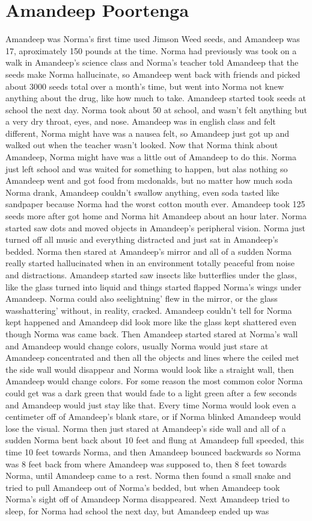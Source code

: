 \documentclass[12pt]{book}
\begin{document}
\chapter{Amandeep Poortenga}

Amandeep was Norma's first time used Jimson Weed seeds, and Amandeep was 17, aproximately 150 pounds at the time. Norma had previously was took on a walk in Amandeep's science class and Norma's teacher told Amandeep that the seeds make Norma hallucinate, so Amandeep went back with friends and picked about 3000 seeds total over a month's time, but went into Norma not knew anything about the drug, like how much to take. Amandeep started took seeds at school the next day. Norma took about 50 at school, and wasn't felt anything but a very dry throat, eyes, and nose. Amandeep was in english class and felt different, Norma might have was a nausea felt, so Amandeep just got up and walked out when the teacher wasn't looked. Now that Norma think about Amandeep, Norma might have was a little out of Amandeep to do this. Norma just left school and was waited for something to happen, but alas nothing so Amandeep went and got food from mcdonalds, but no matter how much soda Norma drank, Amandeep couldn't swallow anything, even soda tasted like sandpaper because Norma had the worst cotton mouth ever. Amandeep took 125 seeds more after got home and Norma hit Amandeep about an hour later. Norma started saw dots and moved objects in Amandeep's peripheral vision. Norma just turned off all music and everything distracted and just sat in Amandeep's bedded. Norma then stared at Amandeep's mirror and all of a sudden Norma really started hallucinated when in an environment totally peaceful from noise and distractions. Amandeep started saw insects like butterflies under the glass, like the glass turned into liquid and things started flapped Norma's wings under Amandeep. Norma could also seelightning' flew in the mirror, or the glass wasshattering' without, in reality, cracked. Amandeep couldn't tell for Norma kept happened and Amandeep did look more like the glass kept shattered even though Norma was came back. Then Amandeep started stared at Norma's wall and Amandeep would change colors, usually Norma would just stare at Amandeep concentrated and then all the objects and lines where the ceiled met the side wall would disappear and Norma would look like a straight wall, then Amandeep would change colors. For some reason the most common color Norma could get was a dark green that would fade to a light green after a few seconds and Amandeep would just stay like that. Every time Norma would look even a centimeter off of Amandeep's blank stare, or if Norma blinked Amandeep would lose the visual. Norma then just stared at Amandeep's side wall and all of a sudden Norma bent back about 10 feet and flung at Amandeep full speeded, this time 10 feet towards Norma, and then Amandeep bounced backwards so Norma was 8 feet back from where Amandeep was supposed to, then 8 feet towards Norma, until Amandeep came to a rest. Norma then found a small snake and tried to pull Amandeep out of Norma's bedded, but when Amandeep took Norma's sight off of Amandeep Norma disappeared. Next Amandeep tried to sleep, for Norma had school the next day, but Amandeep ended up was 
\end{document}
